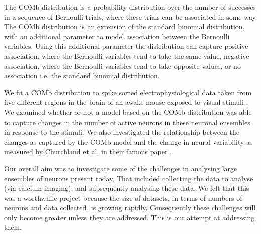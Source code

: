 The COMb distribution is a probability distribution over the number of successes in a sequence of Bernoulli trials, where these trials can be associated in some way. The COMb distribution is an extension of the standard binomial distribution, with an additional parameter to model association between the Bernoulli variables. Using this additional parameter the distribution can capture positive association, where the Bernoulli variables tend to take the same value, negative association, where the Bernoulli variables tend to take opposite values, or no association i.e. the standard binomial distribution.

We fit a COMb distribution to spike sorted electrophysiological data taken from five different regions in the brain of an awake mouse exposed to visual stimuli \parencite{steinmetz2019}. We examined whether or not a model based on the COMb distribution was able to capture changes in the number of active neurons in these neuronal ensembles in response to the stimuli. We also investigated the relationship between the changes as captured by the COMb model and the change in neural variability as measured by Churchland et al. in their famous paper \parencite{Churchland}.

Our overall aim was to investigate some of the challenges in analysing large ensembles of neurons present today. That included collecting the data to analyse (via calcium imaging), and subsequently analysing these data. We felt that this was a worthwhile project because the size of datasets, in terms of numbers of neurons and data collected, is growing rapidly. Consequently these challenges will only become greater unless they are addressed. This is our attempt at addressing them.
